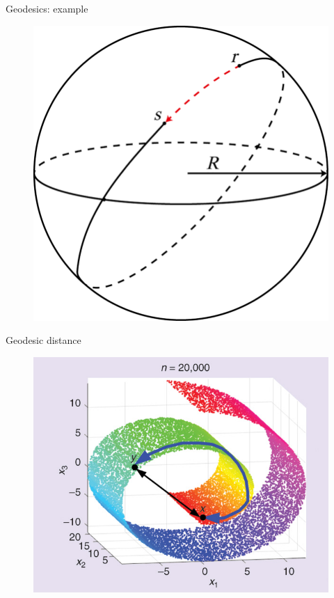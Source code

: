 \documentclass{beamer}
\begin{document}
\begin{frame}{Geodesics: example}
\begin{figure}
\centering
\includegraphics[scale=0.2]{great_circle.png}
\end{figure}
\end{frame}

\begin{frame}{Geodesic distance}
	\begin{figure}
		\centering
		\includegraphics[width=\textwidth]{geodesicdistance.jpg}
    \end{figure}
\end{frame}
\end{document}
